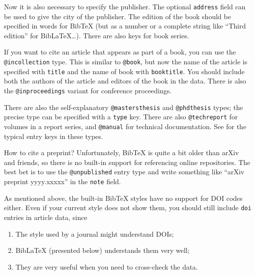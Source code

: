 Now it is also necessary to specify the publisher.
The optional \verb|address| field can be used to give the city of the publisher.
The edition of the book should be specified in words for BibTeX
(but as a number or a complete string like ``Third edition'' for BibLaTeX\dots).
There are also keys for book series.

If you want to cite an article that appears as part of a book,
you can use the \verb|@incollection| type.
This is similar to \verb|@book|,
but now the name of the article is specified with \verb|title|
and the name of book with \verb|booktitle|.
You should include both the authors of the article
and editors of the book in the data.
There is also the \verb|@inproceedings| variant for conference proceedings.

There are also the self-explanatory \verb|@mastersthesis| and \verb|@phdthesis| types;
the precise type can be specified with a \verb|type| key.
There are also \verb|@techreport| for volumes in a report series,
and \verb|@manual| for technical documentation.
See  for the typical entry keys in these types.

How to cite a preprint?
Unfortunately, BibTeX is quite a bit older than arXiv and friends,
so there is no built-in support for referencing online repositories.
The best bet is to use the \verb|@unpublished| entry type
and write something like ``arXiv preprint yyyy.xxxxx'' in the \verb|note| field.

\begin{practices}
As mentioned above, the built-in BibTeX styles have no support for DOI codes either.
Even if your current style does not show them,
you should still include \verb|doi| entries in article data, since
\begin{enumerate}
\item The style used by a journal might understand DOIs;
\item BibLaTeX (presented below) understands them very well;
\item They are very useful when you need to cross-check the data.
\end{enumerate}
\end{practices}


